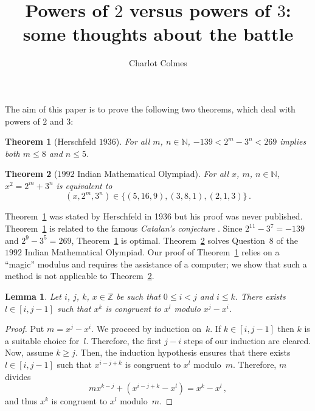 \documentclass[12pt]{article}
\newcommand{\bZ}{\mathbb{Z}}
\newcommand{\bN}{\mathbb{N}} %
\newtheorem{theorem}{Theorem}
\newtheorem{lemma}{Lemma}
\theoremstyle{definition}
\begin{document}
 \title{Powers of $2$ versus powers of $3$: some thoughts about the battle}
 \author{Charlot Colmes}
 \maketitle 


 The aim of this paper is to prove the following two theorems, which deal with powers of $2$ and $3$:

   \begin{theorem}[Herschfeld $1936$] \label{thm:2m-moins-3n}
     For all $m$, $n \in \bN$,
     $- 139 < 2^m - 3^n  < 269$ implies both $m \le 8$ and $n \le 5$.
   \end{theorem}

   
   \begin{theorem}[$1992$ Indian Mathematical Olympiad]  \label{thm:IndMO}
     For all $x$, $m$, $n \in \bN$,
     $x^2 = 2^m + 3^n$ is equivalent to
     $$
     (x, 2^m, 3^n) \in \{  (5, 16, 9), (3, 8, 1), (2, 1, 3) \} \, .
     $$
   \end{theorem}

  
   Theorem~\ref{thm:2m-moins-3n}
   was stated by Herschfeld in 1936 \cite{Herschfeld36, Ribenboim-Catalan} but his proof was never published.
   Theorem~\ref{thm:2m-moins-3n} is related to the famous \emph{Catalan's conjecture} \cite{Ribenboim-Catalan}.
   Since $2^{11} - 3^7 = - 139$ and $2^9 - 3^5 = 269$,
   Theorem~\ref{thm:2m-moins-3n} is optimal.
   Theorem~\ref{thm:IndMO} solves Question~$8$ of the $1992$ Indian Mathematical Olympiad.
   Our proof of Theorem~\ref{thm:2m-moins-3n} relies on a ``magic'' modulus and requires the assistance of a computer;
   we show that such a method is not applicable to Theorem~\ref{thm:IndMO}.

   \begin{lemma} \label{lem:powers-congruent}
     Let $i$, $j$, $k$, $x \in \bZ$ be such that $0 \le i < j$ and $i \le k$.
     There exists $l \in [i, j - 1]$ such that 
     $x^k$ is congruent to  $x^l$ modulo $x^j - x^i$. 
   \end{lemma}

   \begin{proof}
     Put $m = x^j - x^i$.
     We proceed by induction on~$k$.
     If $k \in [i, j - 1]$ then $k$ is a suitable choice for~$l$.
     Therefore, the first $j - i$ steps of our induction are cleared.
     Now, assume $k \ge j$. %
     Then, 
     the induction hypothesis ensures that there exists $l \in [i, j - 1]$ such that
     $x^{i - j + k}$ is congruent to $x^l$ modulo~$m$.
     Therefore, $m$ divides 
     $$
     m x^{k - j} + \left(x^{i - j + k} - x^l \right) =  x^k - x^l \,, 
   $$
   and thus $x^k$ is congruent to $x^l$ modulo~$m$.
     \end{proof}
   
\end{document}
